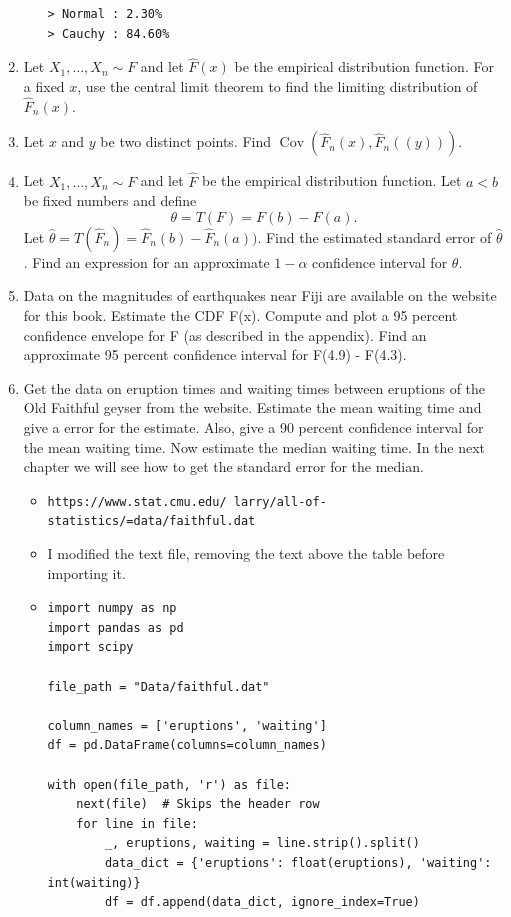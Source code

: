 \documentclass{article}
\begin{document}
\begin{enumerate}
\begin{itemize}
\begin{verbatim}
> Normal : 2.30%
> Cauchy : 84.60%
			\end{verbatim}
		\end{itemize}
	\item Let $X_1, \dots, X_n \sim F$ and let $\hat{F}(x)$ be the empirical distribution function. For a fixed $x$, use the central limit theorem to find the limiting distribution of $\hat{F}_n(x)$.
	\item Let $x$ and $y$ be two distinct points. Find $\operatorname{Cov}(\hat{F}_n(x), \hat{F}_n((y)))$.
	\item Let $X_1, \dots, X_n \sim F$ and let $\hat{F}$ be the empirical distribution function. Let $a < b$ be fixed numbers and define
	$$
	\theta = T(F) = F(b) - F(a).
	$$
	Let $\hat{\theta} = T(\hat{F}_n) = \hat{F}_n(b) - \hat{F}_n(a))$. Find the estimated standard error of $\hat{\theta}$. Find an expression for an approximate $1 - \alpha$ confidence interval for $\theta$.
	\item Data on the magnitudes of earthquakes near Fiji are available on the website for this book. Estimate the CDF F(x). Compute and plot a 95 percent confidence envelope for F (as described in the appendix). Find an approximate 95 percent confidence interval for F(4.9) - F(4.3).
	\item Get the data on eruption times and waiting times between eruptions of the Old Faithful geyser from the website. Estimate the mean waiting time and give a  error for the estimate. Also, give a 90 percent confidence interval for the mean waiting time. Now estimate the median waiting time. In the next chapter we will see how to get the standard error for the median.
		\begin{itemize}
			\item \texttt{https://www.stat.cmu.edu/~larry/all-of-statistics/=data/faithful.dat}
			\item I modified the text file, removing the text above the table before importing it.
			\item
				\begin{verbatim}
import numpy as np
import pandas as pd
import scipy

file_path = "Data/faithful.dat"

column_names = ['eruptions', 'waiting']
df = pd.DataFrame(columns=column_names)

with open(file_path, 'r') as file:
    next(file)  # Skips the header row
    for line in file:
        _, eruptions, waiting = line.strip().split()
        data_dict = {'eruptions': float(eruptions), 'waiting': int(waiting)}
        df = df.append(data_dict, ignore_index=True)



\end{verbatim}
\end{itemize}
\end{enumerate}
\end{document}
